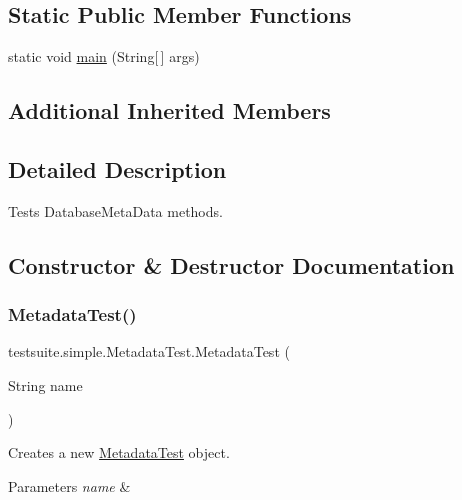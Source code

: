 \subsection*{Static Public Member Functions}
\begin{DoxyCompactItemize}
\item 
static void \mbox{\hyperlink{classtestsuite_1_1simple_1_1_metadata_test_a8a06af1a7d28478dbe8d0b9ec2146908}{main}} (String\mbox{[}$\,$\mbox{]} args)
\end{DoxyCompactItemize}
\subsection*{Additional Inherited Members}


\subsection{Detailed Description}
Tests Database\+Meta\+Data methods. 

\subsection{Constructor \& Destructor Documentation}
\mbox{\label{classtestsuite_1_1simple_1_1_metadata_test_a215f8f5f715ab9a78e98b5c48299c240}} 
\subsubsection{\texorpdfstring{Metadata\+Test()}{MetadataTest()}}
{\footnotesize\ttfamily testsuite.\+simple.\+Metadata\+Test.\+Metadata\+Test (\begin{DoxyParamCaption}\item[{String}]{name }\end{DoxyParamCaption})}

Creates a new \mbox{\hyperlink{classtestsuite_1_1simple_1_1_metadata_test}{Metadata\+Test}} object.


\begin{DoxyParams}{Parameters}
{\em name} & \\
\hline
\end{DoxyParams}


